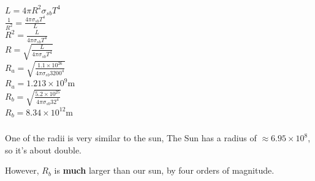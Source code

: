 \documentclass{article}
\begin{document}
\subsubsection{}

\begin{center}

\end{center}

\subsubsection{}

\begin{center}
    
\end{center}

\subsection{}
\subsubsection{}
\begin{center}
    \(L = 4\pi R^2\sigma_{sb} T^4\)\\
    \(\frac{1}{R^2} = \frac{4\pi\sigma_{sb} T^4}{L}\) \\
    \({R^2} = \frac{L}{4\pi\sigma_{sb} T^4}\)\\
    \({R} = \sqrt{\frac{L}{4\pi\sigma_{sb} T^4}}\)
    \vspace{5mm} \\
    \(R_a = \sqrt{\frac{1.1 \times 10^{26}}{4\pi \sigma_{sb} 3200^4}}\)\\
    \(R_a = 1.213 \times 10^{9}\)m\\
    \vspace{5mm}
    \(R_b = \sqrt{\frac{5.2 \times 10^{25}}{4\pi \sigma_{sb} 32^4}}\)\\
    \(R_b = 8.34 \times 10^{12}\)m
    \end{center}

\subsubsection{}
\begin{center}
    One of the radii is very similar to the sun,  The Sun has a radius of \(\approx 6.95 \times 10 ^8\), so it's about double. 

    However, \(R_b\) is \textbf{much} larger than our sun, by four orders of magnitude.

\end{center}
\end{document}

